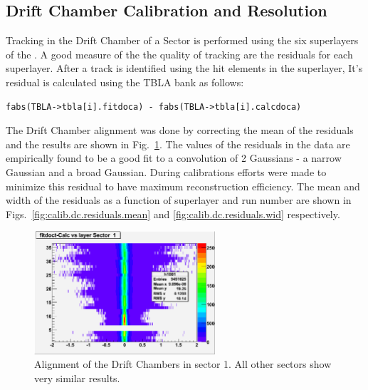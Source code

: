 \subsection{\label{sec:calib.dc}Drift Chamber Calibration and Resolution}

Tracking in the Drift Chamber of a  Sector is performed using the six superlayers of the . A good measure of the the quality of tracking are the  residuals for each superlayer. After a track is identified using the hit elements in the  superlayer, It's  residual is calculated using the TBLA bank as follows:

\begin{verbatim}
fabs(TBLA->tbla[i].fitdoca) - fabs(TBLA->tbla[i].calcdoca)
\end{verbatim}

The Drift Chamber alignment was done by correcting the mean of the residuals and the results are shown in Fig.~\ref{fig:dc.align}.  The values of the  residuals in the  data are empirically found to be a good fit to a convolution of 2 Gaussians - a narrow Gaussian and a broad Gaussian. During  calibrations efforts were made to minimize this residual to have maximum reconstruction efficiency. The mean and width of the residuals as a function of superlayer and run number are shown in Figs.~\ref{fig:calib.dc.residuals.mean} and \ref{fig:calib.dc.residuals.wid} respectively.

\begin{figure}\begin{center}
\includegraphics[width=0.6\textwidth]{figures/calib/dc/dc_align1.eps}
\caption[DC Alignment]{\label{fig:dc.align}Alignment of the Drift Chambers in sector 1. All other sectors show very similar results.}
\end{center}\end{figure}

